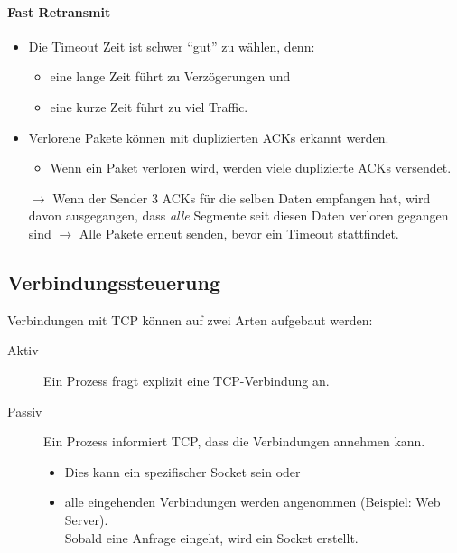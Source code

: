\documentclass[a4paper, 11pt, accentcolor = tud3b]{tudreport}
\begin{document}
                    \paragraph{Fast Retransmit}
	                    \begin{itemize}
	                    	\item Die Timeout Zeit ist schwer \enquote{gut} zu wählen, denn:
		                    	\begin{itemize}
		                    		\item eine lange Zeit führt zu Verzögerungen und
		                    		\item eine kurze Zeit führt zu viel Traffic.
		                    	\end{itemize}
		                    \item Verlorene Pakete können mit duplizierten ACKs erkannt werden.
			                    \begin{itemize}
			                    	\item Wenn ein Paket verloren wird, werden viele duplizierte ACKs versendet.
			                    \end{itemize}
			                \item[\(\rightarrow\)] Wenn der Sender 3 ACKs für die selben Daten empfangen hat, wird davon ausgegangen, dass \textit{alle} Segmente seit diesen Daten verloren gegangen sind \(\rightarrow\) Alle Pakete erneut senden, bevor ein Timeout stattfindet.
	                    \end{itemize}

            \subsection{Verbindungssteuerung}
                Verbindungen mit TCP können auf zwei Arten aufgebaut werden:
                \begin{description}
                	\item[Aktiv] Ein Prozess fragt explizit eine TCP-Verbindung an.
                	\item[Passiv] Ein Prozess informiert TCP, dass die Verbindungen annehmen kann.
	                	\begin{itemize}
	                		\item Dies kann ein spezifischer Socket sein oder
	                		\item alle eingehenden Verbindungen werden angenommen (Beispiel: Web Server). \\ Sobald eine Anfrage eingeht, wird ein Socket erstellt.
	                	\end{itemize}
                \end{description}
                
\end{document}
